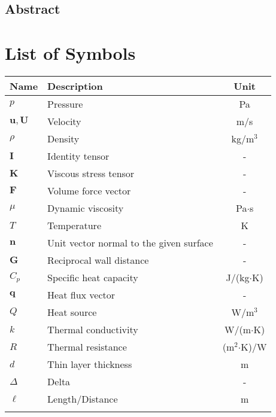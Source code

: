 \documentclass{report}
\begin{document}
\begin{center}
    \newpage \section*{Abstract}    
\end{center}

\newpage \tableofcontents

\newpage \listoffigures

\newpage \listoftables

\newpage \section{List of Symbols}

    \begin{table}[h]
    \centering
    \begin{tabularx}{\textwidth}{ABC}
    \toprule
    \textbf{Name} & \textbf{Description} & \textbf{Unit} \\ 
    \midrule
    \( p \) & Pressure & Pa \\ 
    \( \mathbf{u}, \mathbf{U} \) & Velocity & m/s \\ 
    \( \rho \) & Density & kg/m$^3$ \\ 
    \( \mathbf{I} \) & Identity tensor & - \\ 
    \( \mathbf{K} \) & Viscous stress tensor & - \\ 
    \( \mathbf{F} \) & Volume force vector & - \\ 
    \( \mu \) & Dynamic viscosity & Pa$\cdot$s \\ 
    \( T \) & Temperature & K \\ 
    \( \mathbf{n} \) & Unit vector normal to the given surface & - \\ 
    \( \mathbf{G} \) & Reciprocal wall distance & - \\ 
    \( C_p \) & Specific heat capacity & J/(kg$\cdot$K) \\ 
    \( \mathbf{q} \) & Heat flux vector & - \\ 
    \( Q \) & Heat source & W/m$^3$ \\ 
    \( k \) & Thermal conductivity & W/(m$\cdot$K) \\ 
    \( R \) & Thermal resistance & (m$^2$$\cdot$K)/W \\ 
    \( d \) & Thin layer thickness & m \\ 
    \( \Delta \) & Delta & - \\ 
    \( \ell \) & Length/Distance & m \\ 
$$
\end{tabularx}
\end{table}
\end{document}

